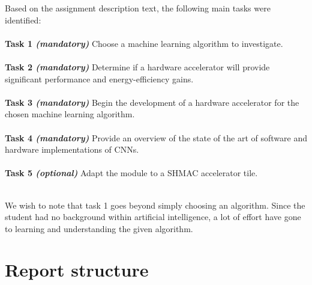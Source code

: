 Based on the assignment description text, the following main tasks were
identified:\\ \hfil \\ \hfil
\textbf{Task 1 \textit{(mandatory)}} Choose a machine learning algorithm to investigate.  \\ \hfil \\ \hfil
\textbf{Task 2 \textit{(mandatory)}} Determine if a hardware accelerator will provide significant performance and energy-efficiency gains.  \\ \hfil \\ \hfil
\textbf{Task 3 \textit{(mandatory)}} Begin the development of a hardware accelerator for the chosen machine learning algorithm. \\ \hfil \\ \hfil
\textbf{Task 4 \textit{(mandatory)}} Provide an overview of the state of the art of software and hardware implementations of CNNs. \\ \hfil \\ \hfil
\textbf{Task 5 \textit{(optional)}} Adapt the module to a SHMAC accelerator tile. \\ \hfil \\ \hfil

We wish to note that task 1 goes beyond simply choosing an algorithm. Since the student had no background within artificial intelligence, a lot of effort have gone to learning and understanding the given algorithm. 


\section{Report structure}

